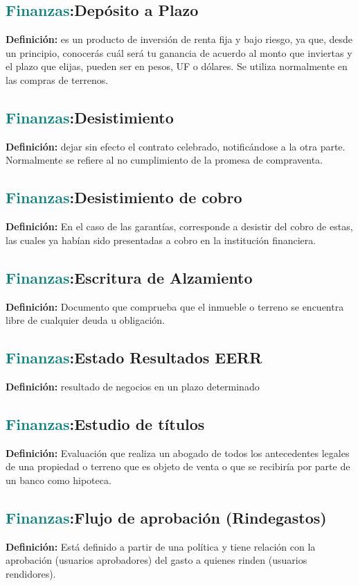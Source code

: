 \documentclass[12pt]{article}
\begin{document}
\subsection{\textcolor{teal}{Finanzas}:{Depósito a Plazo}}
\textbf{Definición:} es un producto de inversión de renta fija y bajo riesgo, ya que, desde un principio, conocerás cuál será tu ganancia de acuerdo al monto que inviertas y el plazo que elijas, pueden ser en pesos, UF o dólares. Se utiliza normalmente en las compras de terrenos.
\subsection{\textcolor{teal}{Finanzas}:{Desistimiento}}
\textbf{Definición:} dejar sin efecto el contrato celebrado, notificándose a la otra parte. Normalmente se refiere al no cumplimiento de la promesa de compraventa. 
\subsection{\textcolor{teal}{Finanzas}:{Desistimiento de cobro}}
\textbf{Definición:} En el caso de las garantías, corresponde a desistir del cobro de estas, las cuales ya habían sido presentadas a cobro en la institución financiera.
\subsection{\textcolor{teal}{Finanzas}:{Escritura de Alzamiento}}
\textbf{Definición:} Documento que comprueba que el inmueble o terreno se encuentra libre de cualquier deuda u obligación.
\subsection{\textcolor{teal}{Finanzas}:{Estado Resultados  EERR}}
\textbf{Definición:} resultado de negocios en un plazo determinado
\subsection{\textcolor{teal}{Finanzas}:{Estudio de títulos}}
\textbf{Definición:} Evaluación que realiza un abogado de todos los antecedentes legales de una propiedad o terreno que es objeto de venta o que se recibiría por parte de un banco como hipoteca.
\subsection{\textcolor{teal}{Finanzas}:{Flujo de aprobación (Rindegastos)}}
\textbf{Definición:} Está definido a partir de una política y tiene relación con la aprobación (usuarios aprobadores) del gasto a quienes rinden (usuarios rendidores).
\end{document}
